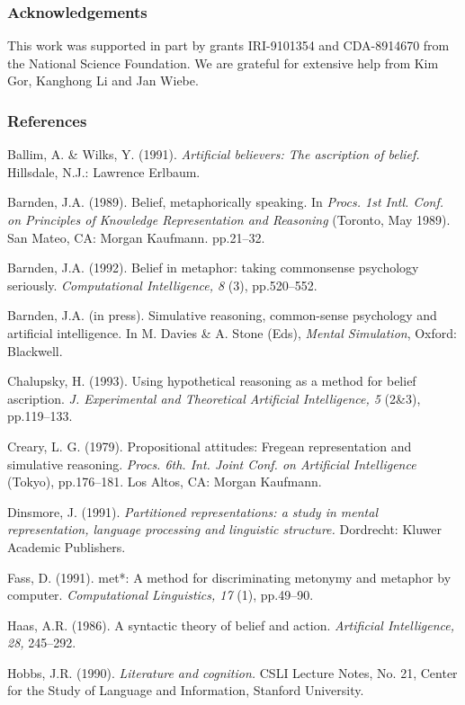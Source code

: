 \subsubsection*{Acknowledgements} 
 
This work was supported in part by grants
IRI-9101354 and CDA-8914670 from the National Science Foundation.
We are grateful for extensive help from Kim Gor, Kanghong Li and Jan Wiebe.

 
\subsubsection*{References} 
 

Ballim, A. \& Wilks, Y. (1991).
{\it Artificial believers: The ascription of belief.}
Hillsdale, N.J.: Lawrence Erlbaum.


Barnden, J.A. (1989).
Belief, metaphorically speaking.
In {\it Procs. 1st Intl. Conf. on Principles of Knowledge Representation and Reasoning} (Toronto, May 1989).
San Mateo, CA: Morgan Kaufmann. pp.21--32.


Barnden, J.A. (1992).
Belief in metaphor: taking commonsense psychology seriously.
{\it Computational Intelligence, 8} (3), pp.520--552.


Barnden, J.A. (in press).
Simulative reasoning, common-sense psychology and artificial intelligence.
In M. Davies \& A. Stone (Eds), {\it Mental Simulation}, Oxford: Blackwell.


Chalupsky, H. (1993).
Using hypothetical reasoning as a method for belief ascription.
{\it J. Experimental and Theoretical Artificial Intelligence, 5} (2\&3), pp.119--133.


Creary, L. G. (1979). 
Propositional attitudes: Fregean representation and simulative reasoning.
{\it Procs. 6th. Int. Joint Conf. on Artificial Intelligence} (Tokyo), pp.176--181.
Los Altos, CA: Morgan Kaufmann. 


Dinsmore, J. (1991).
{\it Partitioned representations: a study in mental representation, language processing and linguistic structure.}
Dordrecht: Kluwer Academic Publishers.


Fass, D. (1991).
met*: A method for discriminating metonymy and metaphor by computer.
{\it Computational Linguistics, 17} (1), pp.49--90.


Haas, A.R. (1986).
A syntactic theory of belief and action.
{\it Artificial Intelligence, 28,} 245--292.


Hobbs, J.R. (1990).
{\it Literature and cognition.}
CSLI Lecture Notes, No. 21, Center for the Study of Language and Information, Stanford University.

